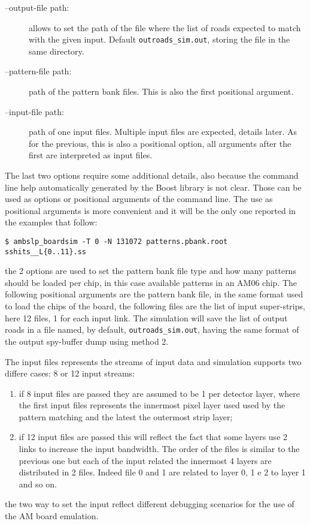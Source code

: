 \begin{description}
	\item[--output-file path:] allows to set the path of the file
	where the list of roads expected to match with the given input.
	Default \texttt{outroads\_sim.out}, storing the file in the 
	same directory.
	
	\item[--pattern-file path:] path of the pattern bank files. This
	is also the first positional argument.
	
	\item[--input-file path:] path of one input files. Multiple input
	files are expected, details later. As for the previous, this is
	also a positional option, all arguments after the first are interpreted
	as input files.
\end{description}

The last two options require some additional details, also because the 
command line help automatically generated by the Boost library is not clear.
Those can be used as options or positional arguments of the command line.
The use as positional arguments is more convenient and it will be the only
one reported in the examples that follow:
\begin{verbatim}
$ ambslp_boardsim -T 0 -N 131072 patterns.pbank.root sshits__L{0..11}.ss
\end{verbatim}
the 2 options are used to set the pattern bank file type and how many
patterns should be loaded per chip, in this case available patterns in an 
AM06 chip.
The following positional arguments are the pattern bank file, in the same format
used to load the chips of the board, the following files are
the list of input super-strips, here 12 files, 1 for each input link.
The simulation will save the list of output roads in a file named, by default,
\texttt{outroads\_sim.out}, having the same format of the output 
spy-buffer dump using method 2.

The input files represents the
streams of input data and simulation supports two differe cases:
8 or 12 input streams:
\begin{enumerate}
	\item if 8 input files are passed they are assumed to be 1 per 
	detector layer, where the first input files represents the innermost
	pixel layer used used by the pattern matching and the latest
	the outermost strip layer;
	
	\item if 12 input files are passed this will reflect the fact that
	some layers use 2 links to increase the input bandwidth. The order
	of the files is similar to the previous one but each of the input
	related the innermost 4 layers are distributed in 2 files. Indeed
	file 0 and 1 are related to layer 0, 1 e 2 to layer 1 and so on.
\end{enumerate}
the two way to set the input reflect different debugging scenarios for the use
of the AM board emulation.

